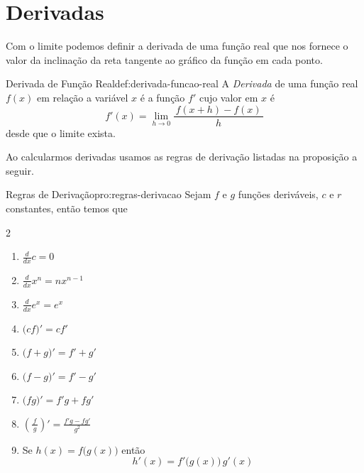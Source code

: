 \section{Derivadas}
\label{sec:Derivadas}

Com o limite podemos definir a derivada de uma função real que nos fornece o
valor da inclinação da reta tangente ao gráfico da função em cada ponto.

\begin{definicao}{Derivada de Função Real}{def:derivada-funcao-real}
  A \emph{Derivada} de uma função real $f(x)$ em relação
  a variável $x$ é a função $f'$ cujo valor em $x$ é
  \[
    f'(x) = \lim_{h\to 0} \frac{\,f(x+h)-f(x)\,}{h}
  \]
  desde que o limite exista.
\end{definicao}

Ao calcularmos derivadas usamos as regras de derivação listadas na proposição
a seguir.

\begin{proposicao}{Regras de Derivação}{pro:regras-derivacao}
  Sejam $f$ e $g$ funções deriváveis, $c$ e $r$ constantes, então temos que
  \begin{multicols}{2}
    \begin{enumerate}[parsep=11pt]
      \item \( \frac{d}{dx} c = 0 \)
      \item \( \frac{d}{dx} x^n = nx^{n-1} \)
      \item \( \frac{d}{dx} e^x = e^x \)
      \item \( \big(cf\big)' = cf' \)
      \item \( \big(f+g\big)' = f' + g' \)
      \item \( \big(f-g\big)' = f' - g' \)
      \item \( \big(fg\big)' = f'g + fg' \)
      \item \( \left(\frac{f}{\,g\,}\right)' = \frac{f'g - fg'}{g^2} \)
      \item Se \(h(x) = f\big(g(x)\big) \) então  \[ h'(x) = f'\big(g(x)\big)\,g'(x) \]
    \end{enumerate}
  \end{multicols}
\end{proposicao}

